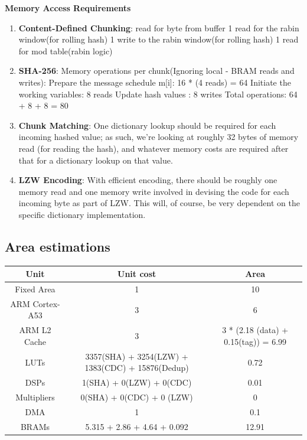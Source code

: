 \documentclass{article}
\begin{document}
\item%
\textbf{Memory Access Requirements}
\begin{enumerate}[label=(\roman*)]
\item%
\textbf{Content-Defined Chunking}: read for byte from buffer 1 read for the rabin window(for rolling hash) 1 write to the rabin window(for
rolling hash) 1 read for mod table(rabin logic)

\item%
\textbf{SHA-256}:\newline
Memory operations per chunk(Ignoring local - BRAM reads and writes): 
Prepare the message schedule m[i]: 16 * (4 reads) = 64 
Initiate the working variables: 8 reads  
Update hash values : 8 writes
Total operations: 64 + 8 + 8 = 80 

\item%
\textbf{Chunk Matching}:\newline
One dictionary lookup should be required for each incoming hashed value; as such, we're looking at roughly 32 bytes of memory read (for reading the hash), and whatever memory costs are required after that for a dictionary lookup on that value.

\item%
\textbf{LZW Encoding}:\newline
With efficient encoding, there should be roughly one memory read and one memory write involved in devising the code for each incoming byte as part of LZW. This will, of course, be very dependent on the specific dictionary implementation.

\end{enumerate}%

\subsection{Area estimations}
\begin{center}
\begin{tabular}{ |c|c|c| } 
 \hline
 \textbf{Unit}  & \textbf{Unit cost} & \textbf{Area} \\ 
 \hline
 Fixed Area   &     1    & 10  \\
 \hline
 ARM Cortex-A53  & 3  & 6\\
 \hline
 ARM L2 Cache  &  3   &  3 * (2.18 (data) + 0.15(tag)) = 6.99\\
 \hline
 LUTs   &   3357(SHA) + 3254(LZW) + 1383(CDC) + 15876(Dedup)   &  0.72  \\
 \hline
 DSPs   &   1(SHA) + 0(LZW) + 0(CDC)    & 0.01\\
 \hline
 Multipliers    &   0(SHA) + 0(CDC) + 0 (LZW)   &   0\\
 \hline
 DMA    &   1 &   0.1\\
 \hline
 BRAMs  & 5.315 +  2.86 + 4.64 + 0.092  &   12.91\\
 \hline
 
\end{tabular}
\end{center}
\end{document}
